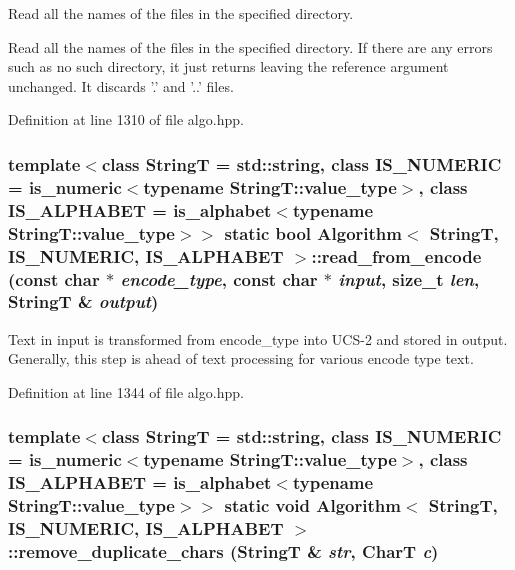 Read all the names of the files in the specified directory. 

Read all the names of the files in the specified directory. If there are any errors such as no such directory, it just returns leaving the reference argument unchanged. It discards '.' and '..' files. 

Definition at line 1310 of file algo.hpp.\hypertarget{classAlgorithm_f51c5e010fd029995daabff0ba2dd224}{
\subsubsection[{read\_\-from\_\-encode}]{\setlength{\rightskip}{0pt plus 5cm}template$<$class StringT  = std::string, class IS\_\-NUMERIC  = is\_\-numeric$<$typename StringT::value\_\-type$>$, class IS\_\-ALPHABET  = is\_\-alphabet$<$typename StringT::value\_\-type$>$$>$ static bool {\bf Algorithm}$<$ StringT, IS\_\-NUMERIC, IS\_\-ALPHABET $>$::read\_\-from\_\-encode (const char $\ast$ {\em encode\_\-type}, \/  const char $\ast$ {\em input}, \/  size\_\-t {\em len}, \/  StringT \& {\em output})}}
\label{classAlgorithm_f51c5e010fd029995daabff0ba2dd224}


Text in input is transformed from encode\_\-type into UCS-2 and stored in output. Generally, this step is ahead of text processing for various encode type text. 

Definition at line 1344 of file algo.hpp.\hypertarget{classAlgorithm_114fe02302e735017ae2277a1b173e96}{
\subsubsection[{remove\_\-duplicate\_\-chars}]{\setlength{\rightskip}{0pt plus 5cm}template$<$class StringT  = std::string, class IS\_\-NUMERIC  = is\_\-numeric$<$typename StringT::value\_\-type$>$, class IS\_\-ALPHABET  = is\_\-alphabet$<$typename StringT::value\_\-type$>$$>$ static void {\bf Algorithm}$<$ StringT, IS\_\-NUMERIC, IS\_\-ALPHABET $>$::remove\_\-duplicate\_\-chars (StringT \& {\em str}, \/  CharT {\em c})}}
\label{classAlgorithm_114fe02302e735017ae2277a1b173e96}


